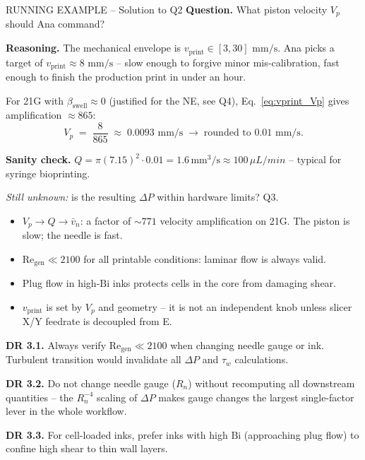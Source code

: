\documentclass[11pt,a4paper]{article}
\newcommand{\mms}{\,\mathrm{mm/s}}
\newcommand{\Bi}{\mathrm{Bi}}
\newcommand{\Rey}{\mathrm{Re}}
\begin{document}
\begin{runningbox}{RUNNING EXAMPLE -- Solution to Q2}
\textbf{Question.} What piston velocity $V_p$ should Ana command?

\medskip\textbf{Reasoning.} The mechanical envelope is
$v_\mathrm{print}\in[3,30]\,\mms$. Ana picks a target of
$v_\mathrm{print}\approx 8\,\mms$ -- slow enough to forgive minor
mis-calibration, fast enough to finish the production print in under
an hour.

For 21G with $\beta_\mathrm{swell}\approx 0$ (justified for the NE,
see Q4), Eq.~\ref{eq:vprint_Vp} gives amplification $\approx 865$:
\[
V_p \;=\; \frac{8}{865} \;\approx\; 0.0093\,\mms
\;\to\; \text{rounded to } \mathbf{0.01\,\mms}.
\]

\textbf{Sanity check.} $Q=\pi(7.15)^2\cdot 0.01=1.6\,\si{\mm^3/\s}
\approx 100\,\si{\mu L/min}$ -- typical for syringe bioprinting.

\medskip\emph{Still unknown:} is the resulting $\Delta P$ within
hardware limits? Q3.
\end{runningbox}

\begin{takeawaybox}
\begin{itemize}[leftmargin=1.4em,itemsep=2pt]
\item $V_p\to Q\to\bar v_n$: a factor of $\sim 771$ velocity
  amplification on 21G. The piston is slow; the needle is fast.
\item $\Rey_\mathrm{gen}\ll 2100$ for all printable conditions: laminar
  flow is always valid.
\item Plug flow in high-$\Bi$ inks protects cells in the core from
  damaging shear.
\item $v_\mathrm{print}$ is set by $V_p$ and geometry -- it is not
  an independent knob unless slicer X/Y feedrate is decoupled from E.
\end{itemize}
\end{takeawaybox}

\begin{designrulebox}
\textbf{DR 3.1.} Always verify $\Rey_\mathrm{gen}\ll 2100$ when changing
needle gauge or ink. Turbulent transition would invalidate all $\Delta P$
and $\tau_w$ calculations.

\textbf{DR 3.2.} Do not change needle gauge ($R_n$) without recomputing
all downstream quantities -- the $R_n^{-4}$ scaling of $\Delta P$ makes
gauge changes the largest single-factor lever in the whole workflow.

\textbf{DR 3.3.} For cell-loaded inks, prefer inks with high $\Bi$
(approaching plug flow) to confine high shear to thin wall layers.
\end{designrulebox}
\end{document}
